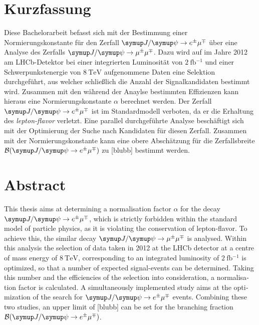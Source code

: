 \thispagestyle{plain}

\section*{Kurzfassung}
Diese Bachelorarbeit befasst sich mit der Bestimmung einer Normierungskonstante für den Zerfall $\signal$ über eine Analyse des Zerfalls $\kontroll$. Dazu wird auf im Jahre 2012 am LHCb-Detektor bei einer integrierten Luminosität von $\SI{2}{\femto\barn^{-1}}$ und einer Schwerpunkstenergie von $\SI{8}{\tera\electronvolt}$ aufgenommene Daten eine Selektion durchgeführt, aus welcher schließlich die Anzahl der Signalkandidaten bestimmt wird. Zusammen mit den während der Anaylse bestimmten Effizienzen kann hieraus eine Normierungskonstante $\alpha$ berechnet werden. Der Zerfall $\signal$ ist im Standardmodell verboten, da er die Erhaltung des \textit{lepton-flavor} verletzt. Eine parallel durchgeführte Analyse beschäftigt sich mit der Optimierung der Suche nach Kandidaten für diesen Zerfall. Zusammen mit der Normierungskonstante kann eine obere Abschätzung für die Zerfallsbreite $\mathcal{B}(\signal)$ zu [blubb] bestimmt werden.

\section*{Abstract}
\begin{english}
This thesis aims at determining a normalisation factor $\alpha$ for the decay $\signal$, which is strictly forbidden within the standard model of particle physics, as it is violating the conservation of lepton-flavor. To achieve this, the similar decay $\kontroll$ is analysed. Within this analysis the selection of data taken in 2012 at the LHCb detector at a centre of mass energy of $\SI{8}{\tera\electronvolt}$, corresponding to an integrated luminosity of $\SI{2}{\femto\barn^{-1}}$ is optimized, so that a number of expected signal-events can be determined. Taking this number and the efficiencies of the selection into consideration, a normalisation factor is calculated. A simultaneously implemented study aims at the optimization of the search for $\signal$ events. Combining these two studies, an upper limit of [blubb] can be set for the branching fraction $\mathcal{B}(\signal)$.
\end{english}
